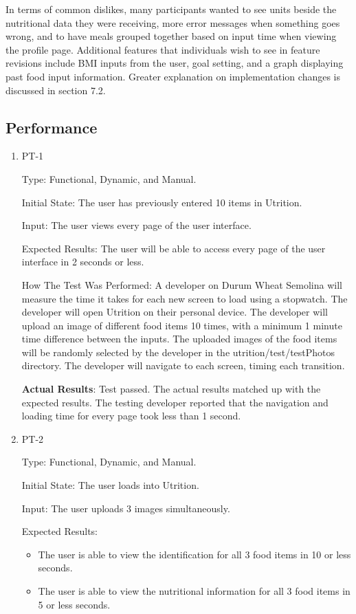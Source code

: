 \documentclass[12pt, titlepage]{article}
\begin{document}
	In terms of common dislikes, many participants wanted to see units beside the nutritional data they were receiving, more error messages when something goes wrong, and to have meals grouped together based on input time when viewing the profile page. Additional features that individuals wish to see in feature revisions include BMI inputs from the user, goal setting, and a graph displaying past food input information. Greater explanation on implementation changes is discussed in section 7.2.
	
	\subsection{Performance}
	
	\begin{enumerate}
		
		\item{PT-1} 
		
		Type: Functional, Dynamic, and Manual.
		
		Initial State: The user has previously entered 10 items in Utrition.
		
		Input: The user views every page of the user interface.
		
		Expected Results: The user will be able to access every page of the user interface in 2 seconds or less.
		
		How The Test Was Performed: A developer on Durum Wheat Semolina will measure the time it takes for each new screen to load using a stopwatch. The developer will open Utrition on their personal device. The developer will upload an image of different food items 10 times, with a minimum 1 minute time difference between the inputs. The uploaded images of the food items will be randomly selected by the developer in the utrition/test/testPhotos directory. The developer will navigate to each screen, timing each transition.
		
		\textbf{Actual Results}: Test passed. The actual results matched up with the expected results. The testing developer reported that the navigation and loading time for every page took less than 1 second.
		
		\item{PT-2} 
		
		Type: Functional, Dynamic, and Manual.
		
		Initial State: The user loads into Utrition.
		
		Input: The user uploads 3 images simultaneously.
		
		Expected Results: 
		\begin{itemize}
			\item The user is able to view the identification for all 3 food items in 10 or less seconds.
			\item The user is able to view the nutritional information for all 3 food items in 5 or less seconds.
		\end{itemize}
		

\end{enumerate}
\end{document}
